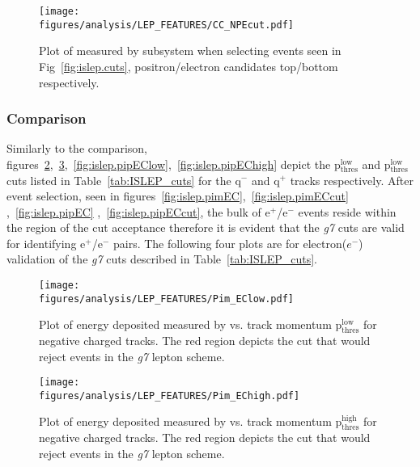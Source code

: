 \begin{figure}[h!]\begin{center}
\texttt{[image: \\figures/analysis/LEP\_FEATURES/CC\_NPEcut.pdf]}
\caption[Number of Photo-electrons Measured by  for \piz Events]{\label{fig:islep.CC1}Plot of  measured by   subsystem when selecting \piz events seen in Fig~\ref{fig:islep.cuts}, positron/electron candidates top/bottom respectively.}
\end{center}\end{figure}
\FloatBarrier
\subsubsection{ Comparison}
%
%

Similarly to the  comparison, figures~\ref{fig:islep.pimEClow},~\ref{fig:islep.pimEChigh},~\ref{fig:islep.pipEClow},~\ref{fig:islep.pipEChigh} depict the  p$\mathrm{_{thres}^{low}}$ and  p$\mathrm{_{thres}^{low}}$ cuts listed in  Table~\ref{tab:ISLEP_cuts} for the q$^-$ and q$^+$ tracks respectively. After \piz event selection, seen in figures~\ref{fig:islep.pimEC},~\ref{fig:islep.pimECcut} ,~\ref{fig:islep.pipEC} ,~\ref{fig:islep.pipECcut}, the bulk of e$^+$/e$^-$ events reside within the region of the cut acceptance therefore it is evident that the \emph{g7}  cuts are valid for identifying e$^+$/e$^-$ pairs. The following four plots are for electron($e^-$)  validation of the \emph{g7}  cuts described in Table~\ref{tab:ISLEP_cuts}.
%
\begin{figure}[h!]\begin{center}
\texttt{[image: \\figures/analysis/LEP\_FEATURES/Pim\_EClow.pdf]}
\caption[ Deposited Energy Comparison to Lower Threshold Track Momentum for q$^-$ Tracks]{\label{fig:islep.pimEClow}Plot of energy deposited measured by  vs. track momentum p$\mathrm{_{thres}^{low}}$ for negative charged tracks. The red region depicts the cut that would reject events in the \emph{g7} lepton   scheme.}
\end{center}\end{figure}

\begin{figure}[h!]\begin{center}
\texttt{[image: \\figures/analysis/LEP\_FEATURES/Pim\_EChigh.pdf]}
\caption[ Deposited Energy Comparison to Upper Threshold Track Momentum for q$^-$ Tracks]{\label{fig:islep.pimEChigh}Plot of energy deposited measured by  vs. track momentum p$\mathrm{_{thres}^{high}}$ for negative charged tracks. The red region depicts the cut that would reject events in the \emph{g7} lepton   scheme.}
\end{center}\end{figure}


